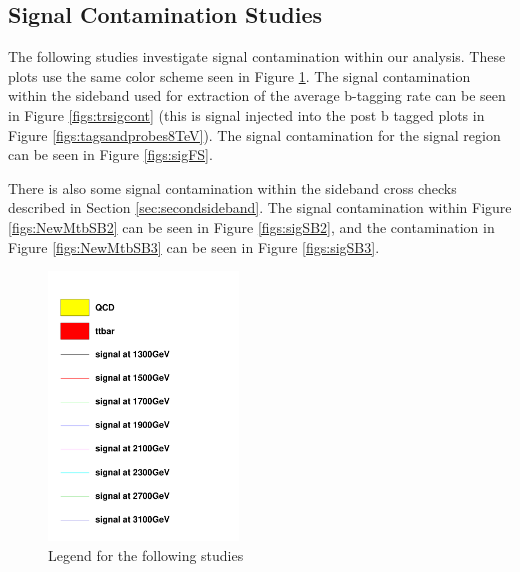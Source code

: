 \subsection{Signal Contamination Studies}
\label{sec:sigcont}
The following studies investigate signal contamination within our analysis.  These plots use the same color scheme seen in Figure \ref{figs:legend}.  
The signal contamination within the sideband used for extraction of the average b-tagging rate can be seen in Figure \ref{figs:trsigcont} (this is signal injected 
into the post b tagged plots in Figure \ref{figs:tagsandprobes8TeV}).  The signal contamination for the signal region can be seen in Figure \ref{figs:sigFS}.

There is also some signal contamination within the sideband cross checks described in Section \ref{sec:secondsideband}.  The signal contamination within Figure \ref{figs:NewMtbSB2} can be seen in Figure \ref{figs:sigSB2}, 
and the contamination in Figure \ref{figs:NewMtbSB3} can be seen in Figure \ref{figs:sigSB3}. 

\begin{figure}[Htcb]
\centering
\includegraphics[width=0.45\textwidth]{AN-13-004/figs/legend.pdf}
\caption{Legend for the following studies}
\label{figs:legend}
\end{figure}

